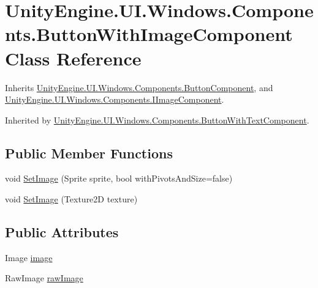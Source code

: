 \hypertarget{class_unity_engine_1_1_u_i_1_1_windows_1_1_components_1_1_button_with_image_component}{}\section{Unity\+Engine.\+U\+I.\+Windows.\+Components.\+Button\+With\+Image\+Component Class Reference}
\label{class_unity_engine_1_1_u_i_1_1_windows_1_1_components_1_1_button_with_image_component}


Inherits \hyperlink{class_unity_engine_1_1_u_i_1_1_windows_1_1_components_1_1_button_component}{Unity\+Engine.\+U\+I.\+Windows.\+Components.\+Button\+Component}, and \hyperlink{interface_unity_engine_1_1_u_i_1_1_windows_1_1_components_1_1_i_image_component}{Unity\+Engine.\+U\+I.\+Windows.\+Components.\+I\+Image\+Component}.



Inherited by \hyperlink{class_unity_engine_1_1_u_i_1_1_windows_1_1_components_1_1_button_with_text_component}{Unity\+Engine.\+U\+I.\+Windows.\+Components.\+Button\+With\+Text\+Component}.

\subsection*{Public Member Functions}
\begin{DoxyCompactItemize}
\item 
void \hyperlink{class_unity_engine_1_1_u_i_1_1_windows_1_1_components_1_1_button_with_image_component_afb89f6c9148e51f39cf281dce1bbd226}{Set\+Image} (Sprite sprite, bool with\+Pivots\+And\+Size=false)
\item 
void \hyperlink{class_unity_engine_1_1_u_i_1_1_windows_1_1_components_1_1_button_with_image_component_a1362d8d792c6fa9370a2679856fba224}{Set\+Image} (Texture2\+D texture)
\end{DoxyCompactItemize}
\subsection*{Public Attributes}
\begin{DoxyCompactItemize}
\item 
Image \hyperlink{class_unity_engine_1_1_u_i_1_1_windows_1_1_components_1_1_button_with_image_component_ad94dfae187add793f7e98b0a7caaab7e}{image}
\item 
Raw\+Image \hyperlink{class_unity_engine_1_1_u_i_1_1_windows_1_1_components_1_1_button_with_image_component_aec3c2565eb2423f8cc10334cb58940f4}{raw\+Image}
\end{DoxyCompactItemize}
